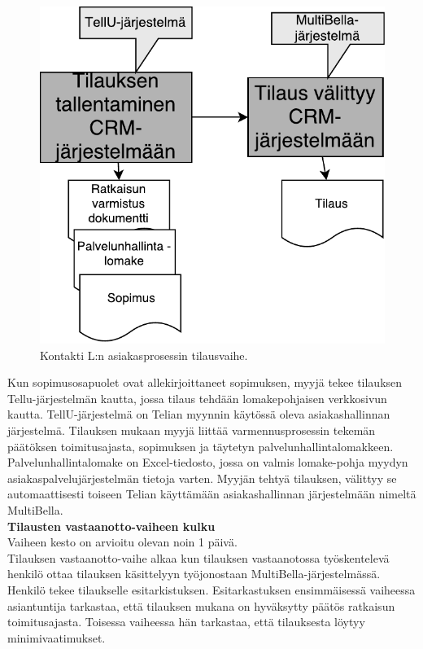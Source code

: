 \documentclass[finnish,12pt,a4paper,pdftex]{article}
\begin{document}
\begin{figure}[!h]
    \centering
    \includegraphics[scale=0.4]{images/tilausv.pdf}
    \caption{Kontakti L:n asiakasprosessin tilausvaihe.}
    \label{fig:tilaus}
\end{figure}

Kun sopimusosapuolet ovat allekirjoittaneet sopimuksen, myyjä tekee tilauksen Tellu-järjestelmän kautta, jossa tilaus tehdään lomakepohjaisen verkkosivun kautta. TellU-järjestelmä on Telian myynnin käytössä oleva asiakashallinnan järjestelmä. Tilauksen mukaan myyjä liittää varmennusprosessin tekemän päätöksen toimitusajasta, sopimuksen ja täytetyn palvelunhallintalomakkeen. Palvelunhallintalomake on Excel-tiedosto, jossa on valmis lomake-pohja myydyn asiakaspalvelujärjestelmän tietoja varten. Myyjän tehtyä tilauksen, välittyy se automaattisesti toiseen Telian käyttämään asiakashallinnan järjestelmään nimeltä MultiBella.\\

\textbf{Tilausten vastaanotto-vaiheen kulku}\\

Vaiheen kesto on arvioitu olevan noin 1 päivä.\\

Tilauksen vastaanotto-vaihe alkaa kun tilauksen vastaanotossa työskentelevä henkilö ottaa tilauksen käsittelyyn työjonostaan MultiBella-järjestelmässä. Henkilö tekee tilaukselle esitarkistuksen. Esitarkastuksen ensimmäisessä vaiheessa asiantuntija tarkastaa, että tilauksen mukana on hyväksytty päätös ratkaisun toimitusajasta. Toisessa vaiheessa hän tarkastaa, että tilauksesta löytyy minimivaatimukset.\\
\end{document}
